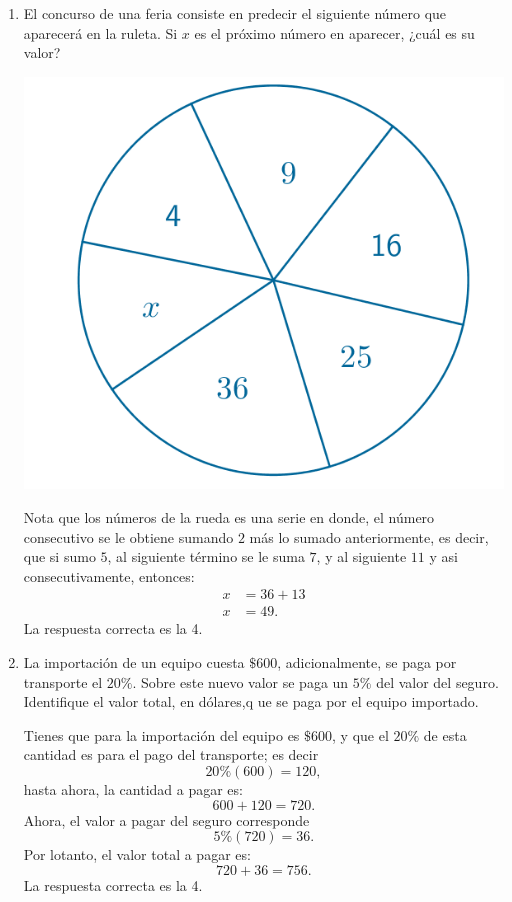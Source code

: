 \documentclass[11pt, a4paper]{article} %
\theoremstyle{dotlessP}
\theoremstyle{dotlessS}
\begin{document}
\begin{enumerate}[label=\color{dg}\theenumi.]
 \item {\color{db}El concurso de una feria consiste en predecir el siguiente número que aparecerá en la ruleta. Si \(x\) es el próximo número en aparecer, ¿cuál es su valor?
 \begin{center}
  		\includegraphics[scale=1]{SerBachiller23_fig1}
  \end{center}
}   
  Nota que los números de la rueda es una serie en donde, el número consecutivo se le obtiene sumando \(2\) más lo sumado anteriormente, es decir, que si sumo \(5\), al siguiente término se le suma \(7\), y al siguiente \(11\) y asi consecutivamente, entonces:
  \begin{align*}
  	x&= 36 + 13\\
    x&= 49.
  \end{align*}
  {\color{dh} La respuesta correcta es la 4.}
  
  \item {\color{db}La importación de un equipo cuesta \(\$ 600\), adicionalmente, se paga por transporte el \( 20 \%\). Sobre este nuevo valor se paga un \(5\%\) del valor del seguro. Identifique el valor total, en dólares,q ue se paga por el equipo importado.  
}   

Tienes que para la importación del equipo es \(\$ 600\), y que el \(20 \%\) de esta cantidad es para el pago del transporte; es decir
\[
	20\% (600)= 120,
\]
hasta ahora, la cantidad a pagar es:
\[
	600 + 120 = 720.
\]
Ahora, el valor a pagar del seguro corresponde
\[
	5\% (720)= 36.
\]
Por lotanto, el valor total a pagar es:
\[
	720 + 36 = 756.
\]
{\color{dh} La respuesta correcta es la 4.}


\end{enumerate}
\end{document}
